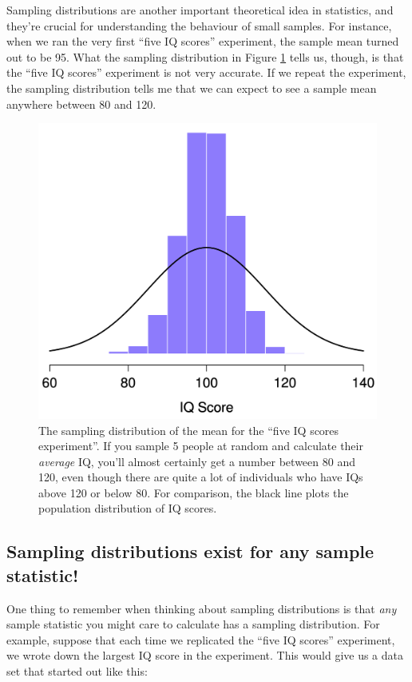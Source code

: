 \documentclass[
]{book}
\theoremstyle{definition}
\theoremstyle{definition}
\theoremstyle{definition}
\theoremstyle{definition}
\theoremstyle{remark}
\begin{document}
Sampling distributions are another important theoretical idea in statistics, and they're crucial for understanding the behaviour of small samples. For instance, when we ran the very first ``five IQ scores'' experiment, the sample mean turned out to be 95. What the sampling distribution in Figure \ref{fig:sampdistmean} tells us, though, is that the ``five IQ scores'' experiment is not very accurate. If we repeat the experiment, the sampling distribution tells me that we can expect to see a sample mean anywhere between 80 and 120.



\begin{figure}

{\centering \includegraphics[width=0.66\linewidth]{resources/image/sampleDist4} 

}

\caption{The sampling distribution of the mean for the ``five IQ scores experiment''. If you sample 5 people at random and calculate their \emph{average} IQ, you'll almost certainly get a number between 80 and 120, even though there are quite a lot of individuals who have IQs above 120 or below 80. For comparison, the black line plots the population distribution of IQ scores.}\label{fig:sampdistmean}
\end{figure}

\hypertarget{sampling-distributions-exist-for-any-sample-statistic}{%
\subsection{Sampling distributions exist for any sample statistic!}\label{sampling-distributions-exist-for-any-sample-statistic}}

One thing to remember when thinking about sampling distributions is that \emph{any} sample statistic you might care to calculate has a sampling distribution. For example, suppose that each time we replicated the ``five IQ scores'' experiment, we wrote down the largest IQ score in the experiment. This would give us a data set that started out like this:
\end{document}
